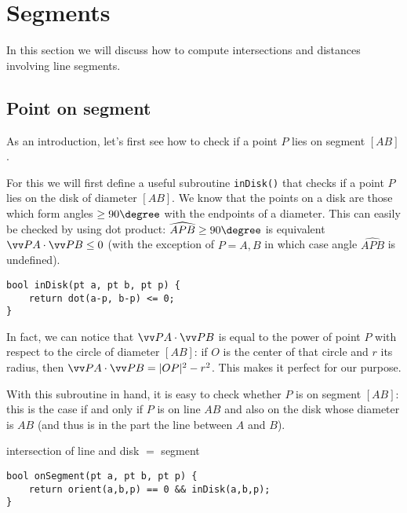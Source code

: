 \section{Segments}
In this section we will discuss how to compute intersections and distances involving line segments.

\subsection{Point on segment}\label{onsegment}
As an introduction, let's first see how to check if a point $P$ lies on segment $[AB]$.

For this we will first define a useful subroutine \lstinline|inDisk()| that checks if a point $P$ lies on the disk of diameter $[AB]$. We know that the points on a disk are those which form angles $\geq 90\degree$ with the endpoints of a diameter. This can easily be checked by using dot product: $\widehat{APB} \geq 90\degree$ is equivalent $\dotv{PA}{PB} \leq 0$ (with the exception of $P=A,B$ in which case angle $\widehat{APB}$ is undefined).


\begin{lstlisting}
bool inDisk(pt a, pt b, pt p) {
    return dot(a-p, b-p) <= 0;
}
\end{lstlisting}

\begin{mathy}
In fact, we can notice that $\dotv{PA}{PB}$ is equal to the power of point $P$ with respect to the circle of diameter $[AB]$: if $O$ is the center of that circle and $r$ its radius, then $\dotv{PA}{PB} = |OP|^2 - r^2$. This makes it perfect for our purpose.
\end{mathy}

With this subroutine in hand, it is easy to check whether $P$ is on segment $[AB]$: this is the case if and only if $P$ is on line $AB$ and also on the disk whose diameter is $AB$ (and thus is in the part the line between $A$ and $B$).

\begin{center}

intersection of line and disk $=$ segment
\end{center}

\begin{lstlisting}
bool onSegment(pt a, pt b, pt p) {
    return orient(a,b,p) == 0 && inDisk(a,b,p);
}
\end{lstlisting}

